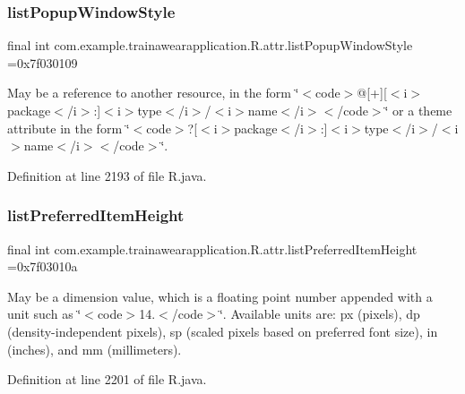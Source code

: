 \subsubsection{\texorpdfstring{listPopupWindowStyle}{listPopupWindowStyle}}
{\footnotesize\ttfamily final int com.\+example.\+trainawearapplication.\+R.\+attr.\+list\+Popup\+Window\+Style =0x7f030109\hspace{0.3cm}{\ttfamily [static]}}

May be a reference to another resource, in the form \char`\"{}$<$code$>$@\mbox{[}+\mbox{]}\mbox{[}$<$i$>$package$<$/i$>$\+:\mbox{]}$<$i$>$type$<$/i$>$/$<$i$>$name$<$/i$>$$<$/code$>$\char`\"{} or a theme attribute in the form \char`\"{}$<$code$>$?\mbox{[}$<$i$>$package$<$/i$>$\+:\mbox{]}$<$i$>$type$<$/i$>$/$<$i$>$name$<$/i$>$$<$/code$>$\char`\"{}. 

Definition at line 2193 of file R.\+java.

\mbox{\label{classcom_1_1example_1_1trainawearapplication_1_1_r_1_1attr_a4462ad7c7732c7e27c9e79e7edadf79b}} 
\subsubsection{\texorpdfstring{listPreferredItemHeight}{listPreferredItemHeight}}
{\footnotesize\ttfamily final int com.\+example.\+trainawearapplication.\+R.\+attr.\+list\+Preferred\+Item\+Height =0x7f03010a\hspace{0.3cm}{\ttfamily [static]}}

May be a dimension value, which is a floating point number appended with a unit such as \char`\"{}$<$code$>$14.\+5sp$<$/code$>$\char`\"{}. Available units are\+: px (pixels), dp (density-\/independent pixels), sp (scaled pixels based on preferred font size), in (inches), and mm (millimeters). 

Definition at line 2201 of file R.\+java.

\mbox{\label{classcom_1_1example_1_1trainawearapplication_1_1_r_1_1attr_a1d042800aa57219351e0eaada5833ef4}} 
